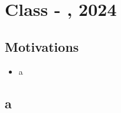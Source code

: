 \documentclass[../category_theory.tex]{subfiles}
\begin{document}
\section{Class - , 2024}
\subsection{Motivations}
\begin{itemize}
	\item a
\end{itemize}
\subsection{a}
\end{document}
